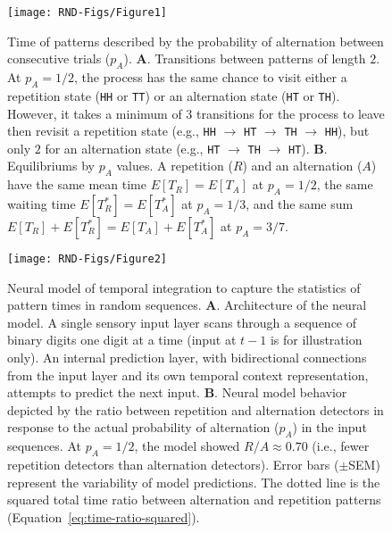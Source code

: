 \documentclass{pnastwo}
\begin{document}
\begin{figure}
  \centering\texttt{[image: RND-Figs/Figure1]}
  \caption{Time of patterns described by the probability of alternation between consecutive trials ($p_A$).
  \textbf{A}. Transitions between patterns of length $2$.
  At $p_A\!=\!1/2$, the process has the same chance to visit either a repetition state (\texttt{HH} or \texttt{TT}) or an alternation state (\texttt{HT} or \texttt{TH}).
  However, it takes a minimum of $3$ transitions for the process to leave then revisit a repetition state (e.g., \texttt{HH} $\rightarrow$ \texttt{HT} $\rightarrow$ \texttt{TH} $\rightarrow$ \texttt{HH}), but only $2$ for an alternation state (e.g., \texttt{HT} $\rightarrow$ \texttt{TH} $\rightarrow$ \texttt{HT}).
  \textbf{B}. Equilibriums by $p_A$ values. A repetition ($R$) and an alternation ($A$) have the same mean time $E[T_R] = E[T_A]$ at $p_A\!=\!1/2$, the same waiting time $E[T^*_R] = E[T^*_A]$ at $p_A\!=\!1/3$, and the same sum $E[T_R] + E[T^*_R] = E[T_A] + E[T^*_A]$ at $p_A\!=\!3/7$.
  }
  \label{fig1}
\end{figure}


\begin{figure}
  \centering\texttt{[image: RND-Figs/Figure2]}
  \caption{Neural model of temporal integration to capture the statistics of pattern times in random sequences.
  \textbf{A}. Architecture of the neural model.
  A single sensory input layer scans through a sequence of binary digits one digit at a time (input at $t-1$ is for illustration only).
  An internal prediction layer, with bidirectional connections from the input layer and its own temporal context representation, attempts to predict the next input.
  \textbf{B}. Neural model behavior depicted by the ratio between repetition and alternation detectors in response to the actual probability of alternation ($p_A$) in the input sequences.
  At $p_A = 1/2$, the model showed $R/A \approx 0.70$ (i.e., fewer repetition detectors than alternation detectors).
  Error bars ($\pm$SEM) represent the variability of model predictions. The dotted line is the squared total time ratio between alternation and repetition patterns (Equation~\ref{eq:time-ratio-squared}).
  }
  \label{fig2}
\end{figure}
\end{document}
